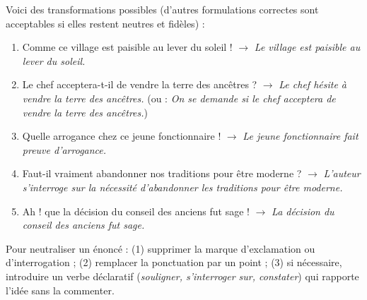\documentclass[11pt]{article}
\begin{document}
\begin{corrige}
Voici des transformations possibles (d'autres formulations correctes sont acceptables si elles restent neutres et fidèles) :
\begin{enumerate}
\item Comme ce village est paisible au lever du soleil ! $\rightarrow$ \emph{Le village est paisible au lever du soleil.}
\item Le chef acceptera-t-il de vendre la terre des ancêtres ? $\rightarrow$ \emph{Le chef hésite à vendre la terre des ancêtres.} (ou : \emph{On se demande si le chef acceptera de vendre la terre des ancêtres.})
\item Quelle arrogance chez ce jeune fonctionnaire ! $\rightarrow$ \emph{Le jeune fonctionnaire fait preuve d'arrogance.}
\item Faut-il vraiment abandonner nos traditions pour être moderne ? $\rightarrow$ \emph{L'auteur s'interroge sur la nécessité d'abandonner les traditions pour être moderne.}
\item Ah ! que la décision du conseil des anciens fut sage ! $\rightarrow$ \emph{La décision du conseil des anciens fut sage.}
\end{enumerate}
\end{corrige}

\begin{methode}
Pour neutraliser un énoncé : (1) supprimer la marque d'exclamation ou d'interrogation ; (2) remplacer la ponctuation par un point ; (3) si nécessaire, introduire un verbe déclaratif (\emph{souligner, s'interroger sur, constater}) qui rapporte l'idée sans la commenter.
\end{methode}
\end{document}
